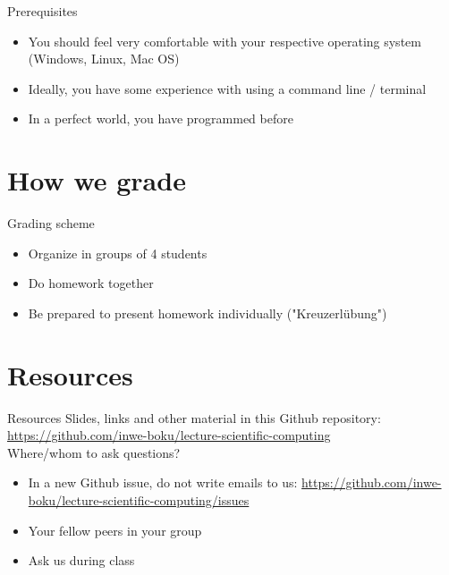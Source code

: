 \documentclass[10pt,color=usenames,dvipsnames]{beamer}
\begin{document}
\begin{frame}{Prerequisites}
	\begin{itemize}
        \item You should feel very comfortable with your respective operating system (Windows, Linux, Mac OS)
		\item Ideally, you have some experience with using a command line / terminal
		\item In a perfect world, you have programmed before
	\end{itemize}
\end{frame}


\section{How we grade}

\begin{frame}{Grading scheme}

	\begin{itemize}
		\item Organize in groups of 4 students	
		\item Do homework together
		\item Be prepared to present homework individually ("Kreuzerlübung")
	\end{itemize}

\end{frame}

\section{Resources}

\begin{frame}[fragile]{Resources}
    Slides, links and other material in this Github repository:
    \href{https://github.com/inwe-boku/lecture-scientific-computing}{https://github.com/inwe-boku/lecture-scientific-computing}\\
    \bigskip
    \pause
    Where/whom to ask questions?
	\begin{itemize}
        \item In a new Github issue, do not write emails to us:
            \href{https://github.com/inwe-boku/lecture-scientific-computing/issues}{https://github.com/inwe-boku/lecture-scientific-computing/issues}
		\item Your fellow peers in your group
		\item Ask us during class
	\end{itemize}
\end{frame}
\end{document}
